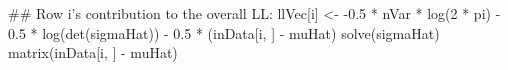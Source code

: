 \begin{Schunk}
\begin{Sinput}
 ## Row i's contribution to the overall LL:
 llVec[i] <- -0.5 * nVar * log(2 * pi) -
     0.5 * log(det(sigmaHat)) -
         0.5 * (inData[i, ] - muHat) %*%
             solve(sigmaHat) %*%
                 matrix(inData[i, ] - muHat)
\end{Sinput}
\end{Schunk}
